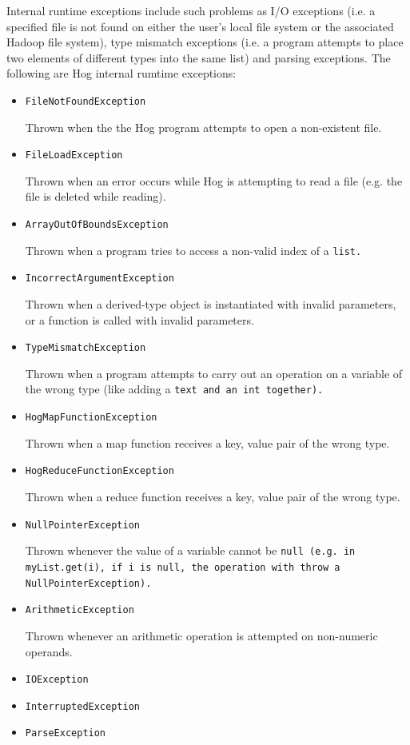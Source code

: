 \documentclass{article}
\begin{document}
Internal run­time exceptions include such problems as I/O exceptions (i.e. a specified file is not found on either the user’s
local file system or the associated Hadoop file system), type mismatch exceptions (i.e. a program attempts to place two
elements of different types into the same list) and parsing exceptions. The following are Hog internal rum­time exceptions:


\begin{itemize}
  \item[] \tt FileNotFoundException \rm
  
  Thrown when the the Hog program attempts to open a non-existent file.
  
  \item[] \tt FileLoadException \rm
  
  Thrown when an error occurs while Hog is attempting to read a file (e.g. the file is deleted while reading).
  
  \item[] \tt ArrayOutOfBoundsException \rm
  
  Thrown when a program tries to access a non-valid index of a \tt list\rm.
  
  \item[] \tt IncorrectArgumentException \rm
  
  Thrown when a derived-type object is instantiated with invalid parameters, or a function is called with invalid parameters.
  
  \item[] \tt TypeMismatchException \rm
  
  Thrown when a program attempts to carry out an operation on a variable of the wrong type (like adding a \tt text \rm and an
  \tt int \rm together).
  
  \item[] \tt HogMapFunctionException \rm
  
  Thrown when a map function receives a key, value pair of the wrong type.
  
  \item[] \tt HogReduceFunctionException \rm
  
  Thrown when a reduce function receives a key, value pair of the wrong type.
  
  \item[] \tt NullPointerException \rm
  
  Thrown whenever the value of a variable cannot be \tt null \rm (e.g. in \tt myList.get(i)\rm, if \tt i \rm is \tt null\rm,
  the operation with throw a \tt NullPointerException\rm).
  
  \item[] \tt ArithmeticException \rm
  
  Thrown whenever an arithmetic operation is attempted on non-numeric operands.
  
  \item[] \tt IOException \rm
  
  \item[] \tt InterruptedException \rm
  
  \item[] \tt ParseException \rm
\end{itemize}
\end{document}

